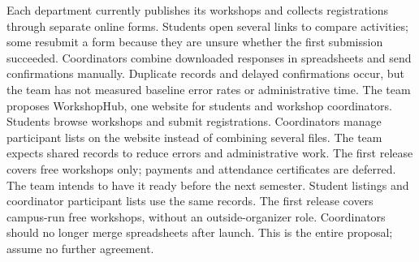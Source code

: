 \answerlabel\answerfill
\newpage
\begin{contenttable}
{Each department currently publishes its workshops and collects registrations through separate online forms. Students open several links to compare activities; some resubmit a form because they are unsure whether the first submission succeeded. Coordinators combine downloaded responses in spreadsheets and send confirmations manually. Duplicate records and delayed confirmations occur, but the team has not measured baseline error rates or administrative time.}
{The team proposes WorkshopHub, one website for students and workshop coordinators. Students browse workshops and submit registrations. Coordinators manage participant lists on the website instead of combining several files. The team expects shared records to reduce errors and administrative work. The first release covers free workshops only; payments and attendance certificates are deferred. The team intends to have it ready before the next semester.}
{Student listings and coordinator participant lists use the same records. The first release covers campus-run free workshops, without an outside-organizer role. Coordinators should no longer merge spreadsheets after launch. This is the entire proposal; assume no further agreement.}
\end{contenttable}

